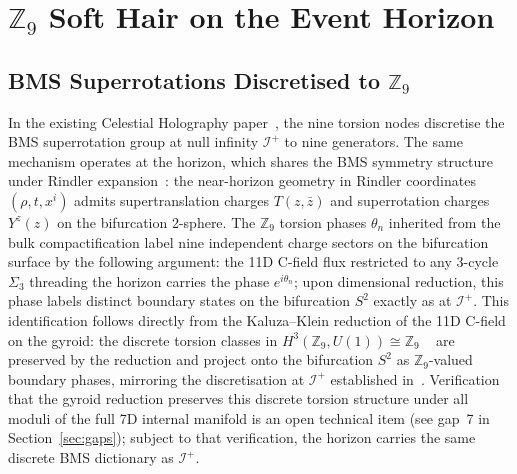 \documentclass[11pt,a4paper]{article}
\begin{document}
\section{$\mathbb{Z}_9$ Soft Hair on the Event Horizon}
\label{sec:hair}

\subsection{BMS Superrotations Discretised to $\mathbb{Z}_9$}

In the existing Celestial Holography paper~\cite{BresslerCH2026}, the nine torsion
nodes discretise the BMS superrotation group at null infinity $\mathscr{I}^+$ to
nine generators.  The same mechanism operates at the horizon, which shares the
BMS symmetry structure under Rindler expansion~\cite{Donnay2016}: the near-horizon
geometry in Rindler coordinates $(\rho, t, x^i)$ admits supertranslation charges
$T(z,\bar{z})$ and superrotation charges $Y^z(z)$ on the bifurcation 2-sphere.
The $\mathbb{Z}_9$ torsion phases $\theta_n$ inherited from the bulk
compactification label nine independent charge sectors on the bifurcation surface
by the following argument: the 11D C-field flux restricted to any 3-cycle
$\Sigma_3$ threading the horizon carries the phase $e^{i\theta_n}$; upon
dimensional reduction, this phase labels distinct boundary states on the
bifurcation $S^2$ exactly as at $\mathscr{I}^+$.  This identification follows
directly from the Kaluza--Klein reduction of the 11D C-field on the gyroid:
the discrete torsion classes in $H^3(\mathbb{Z}_9, U(1)) \cong \mathbb{Z}_9$
~\cite{Vafa1986,AspinwallMorrison1995} are preserved by the reduction and project
onto the bifurcation $S^2$ as $\mathbb{Z}_9$-valued boundary phases, mirroring
the discretisation at $\mathscr{I}^+$ established in~\cite{BresslerCH2026}.
Verification that the gyroid reduction preserves this discrete torsion
structure under all moduli of the full 7D internal manifold is an open
technical item (see gap~7 in Section~\ref{sec:gaps}); subject to that
verification, the horizon carries the same discrete BMS dictionary as
$\mathscr{I}^+$.
\end{document}
